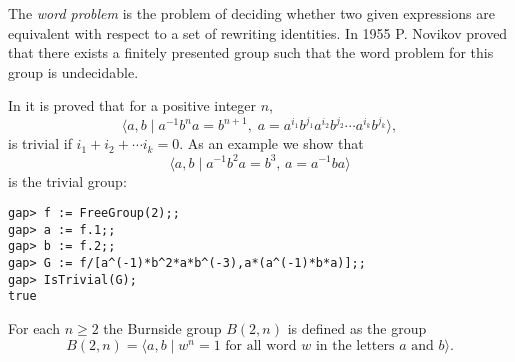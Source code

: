 \begin{remark}
The \emph{word problem} is the problem of deciding whether two given expressions are equivalent with respect to a set of rewriting identities. 
In 1955 P. Novikov proved that there exists a finitely presented group 
such that the word problem for this group is undecidable.
\end{remark}

\begin{example}
In \cite{MR1732210} it is proved that for a positive integer  $n$, 
\[
\langle a,b \mid a^{-1}b^na=b^{n+1},\;a=a^{i_1}b^{j_1}a^{i_2}b^{j_2}\cdots a^{i_k}b^{j_k}\rangle,
\]
is trivial if $i_1+i_2+\cdots i_k=0$. As an example we show that
\[
\langle a,b\mid a^{-1}b^2a=b^3,\,a=a^{-1}ba\rangle
\]
is the trivial group: 
\begin{lstlisting}
gap> f := FreeGroup(2);;
gap> a := f.1;;
gap> b := f.2;;
gap> G := f/[a^(-1)*b^2*a*b^(-3),a*(a^(-1)*b*a)];;
gap> IsTrivial(G);
true
\end{lstlisting}
\end{example}

For each $n\geq2$ the Burnside group $B(2,n)$ is defined as the group 
\[
        B(2,n)=\langle a,b\mid w^n=1\text{ for all word $w$ in the letters $a$ and $b$}\rangle. 
\]

